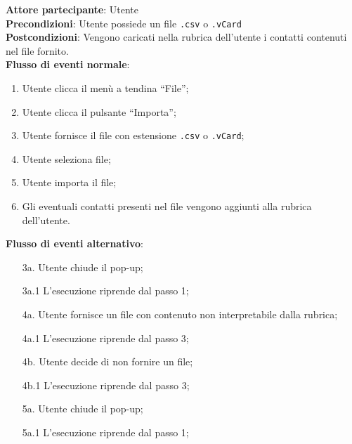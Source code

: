 \begin{tcolorbox}[colback=white,colframe=black!80!white,title=\textbf{C4 - Importare rubrica}]
	\textbf{Attore partecipante}: Utente
	\\\textbf{Precondizioni}: Utente possiede un file \texttt{.csv} o \texttt{.vCard}
	\\\textbf{Postcondizioni}: Vengono caricati nella rubrica dell’utente i contatti contenuti nel file fornito.
	\\\textbf{Flusso di eventi normale}:
	\begin{enumerate}[noitemsep, topsep=0pt]
		\item Utente clicca il menù a tendina “File”;
		\item Utente clicca il pulsante “Importa”;
		\item Utente fornisce il file con estensione \texttt{.csv} o \texttt{.vCard};
		\item Utente seleziona file;
		\item Utente importa il file;
		\item Gli eventuali contatti presenti nel file vengono aggiunti alla rubrica dell’utente.		
	\end{enumerate}
	\textbf{Flusso di eventi alternativo}:
	\begin{itemize}[noitemsep, topsep=0pt]
		\item[3a. ] Utente chiude il pop-up;
		\item[3a.1] L’esecuzione riprende dal passo 1;
		\item[4a. ] Utente fornisce un file con contenuto non interpretabile dalla rubrica;
		\item[4a.1] L’esecuzione riprende dal passo 3;
		\item[4b. ] Utente decide di non fornire un file;
		\item[4b.1] L’esecuzione riprende dal passo 3;
		\item[5a. ] Utente chiude il pop-up;
		\item[5a.1] L’esecuzione riprende dal passo 1;
		
	\end{itemize}
\end{tcolorbox}

